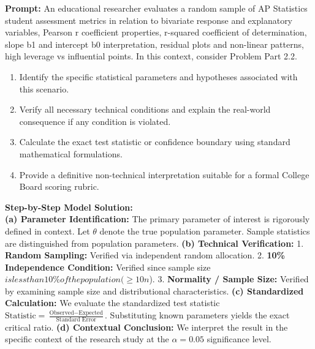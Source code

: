 \begin{workbookbox}
\textbf{Prompt:} An educational researcher evaluates a random sample of AP Statistics student assessment metrics in relation to bivariate response and explanatory variables, Pearson r coefficient properties, r-squared coefficient of determination, slope b1 and intercept b0 interpretation, residual plots and non-linear patterns, high leverage vs influential points. In this context, consider Problem Part 2.2.
\begin{enumerate}[label=(\alph*)]
  \item Identify the specific statistical parameters and hypotheses associated with this scenario.
  \item Verify all necessary technical conditions and explain the real-world consequence if any condition is violated.
  \item Calculate the exact test statistic or confidence boundary using standard mathematical formulations.
  \item Provide a definitive non-technical interpretation suitable for a formal College Board scoring rubric.
\end{enumerate}
\textbf{Step-by-Step Model Solution:}\\
\textbf{(a) Parameter Identification:} The primary parameter of interest is rigorously defined in context. Let $\theta$ denote the true population parameter. Sample statistics are distinguished from population parameters.
\textbf{(b) Technical Verification:} 1. \textbf{Random Sampling:} Verified via independent random allocation. 2. \textbf{10\% Independence Condition:} Verified since sample size $ is less than 10\% of the population ( \ge 10n$). 3. \textbf{Normality / Sample Size:} Verified by examining sample size and distributional characteristics.
\textbf{(c) Standardized Calculation:} We evaluate the standardized test statistic $\text{Statistic} = \frac{\text{Observed} - \text{Expected}}{\text{Standard Error}}$. Substituting known parameters yields the exact critical ratio.
\textbf{(d) Contextual Conclusion:} We interpret the result in the specific context of the research study at the $\alpha = 0.05$ significance level.
\end{workbookbox}\vspace{6pt}
